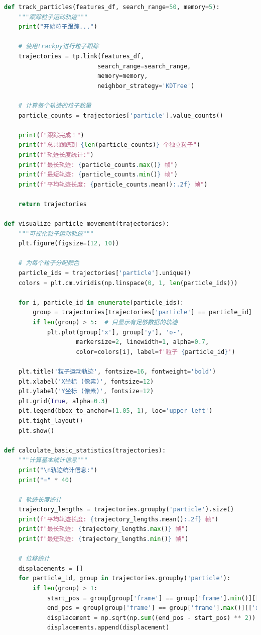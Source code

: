 \documentclass[a4paper]{report} %
\begin{document}
\begin{lstlisting}[language=Python, caption=可视化与计算, label=code:calculate]
def track_particles(features_df, search_range=50, memory=5):
    """跟踪粒子运动轨迹"""
    print("开始粒子跟踪...")
    
    # 使用trackpy进行粒子跟踪
    trajectories = tp.link(features_df, 
                          search_range=search_range, 
                          memory=memory,
                          neighbor_strategy='KDTree')
    
    # 计算每个轨迹的粒子数量
    particle_counts = trajectories['particle'].value_counts()
    
    print(f"跟踪完成！")
    print(f"总共跟踪到 {len(particle_counts)} 个独立粒子")
    print(f"轨迹长度统计:")
    print(f"最长轨迹: {particle_counts.max()} 帧")
    print(f"最短轨迹: {particle_counts.min()} 帧")
    print(f"平均轨迹长度: {particle_counts.mean():.2f} 帧")
    
    return trajectories

def visualize_particle_movement(trajectories):
    """可视化粒子运动轨迹"""
    plt.figure(figsize=(12, 10))
    
    # 为每个粒子分配颜色
    particle_ids = trajectories['particle'].unique()
    colors = plt.cm.viridis(np.linspace(0, 1, len(particle_ids)))
    
    for i, particle_id in enumerate(particle_ids):
        group = trajectories[trajectories['particle'] == particle_id]
        if len(group) > 5:  # 只显示有足够数据的轨迹
            plt.plot(group['x'], group['y'], 'o-', 
                    markersize=2, linewidth=1, alpha=0.7, 
                    color=colors[i], label=f'粒子 {particle_id}')
    
    plt.title('粒子运动轨迹', fontsize=16, fontweight='bold')
    plt.xlabel('X坐标 (像素)', fontsize=12)
    plt.ylabel('Y坐标 (像素)', fontsize=12)
    plt.grid(True, alpha=0.3)
    plt.legend(bbox_to_anchor=(1.05, 1), loc='upper left')
    plt.tight_layout()
    plt.show()

def calculate_basic_statistics(trajectories):
    """计算基本统计信息"""
    print("\n轨迹统计信息:")
    print("=" * 40)
    
    # 轨迹长度统计
    trajectory_lengths = trajectories.groupby('particle').size()
    print(f"平均轨迹长度: {trajectory_lengths.mean():.2f} 帧")
    print(f"最长轨迹: {trajectory_lengths.max()} 帧")
    print(f"最短轨迹: {trajectory_lengths.min()} 帧")
    
    # 位移统计
    displacements = []
    for particle_id, group in trajectories.groupby('particle'):
        if len(group) > 1:
            start_pos = group[group['frame'] == group['frame'].min()][['x', 'y']].values[0]
            end_pos = group[group['frame'] == group['frame'].max()][['x', 'y']].values[0]
            displacement = np.sqrt(np.sum((end_pos - start_pos) ** 2))
            displacements.append(displacement)
    

\end{lstlisting}
\end{document}
